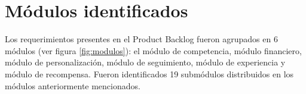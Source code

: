 
\section{Módulos identificados}


    Los requerimientos presentes en el Product Backlog fueron agrupados en 6 módulos (ver figura \ref{fig:modulos}): el módulo de competencia, módulo financiero, módulo de personalización, módulo de seguimiento, módulo de experiencia y módulo de recompensa. Fueron identificados 19 submódulos distribuidos en los módulos anteriormente mencionados.\\

 
